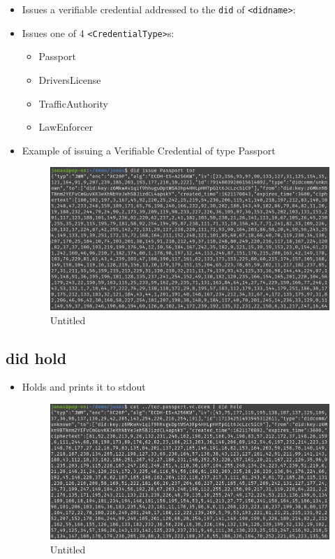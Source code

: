 \begin{itemize}
\item
  Issues a verifiable credential addressed to the
  \lstinline!did! of \lstinline!<didname>!:
\item
  Issues one of 4 \lstinline!<CredentialType>!s:

  \begin{itemize}
  \tightlist
  \item
    Passport
  \item
    DriversLicense
  \item
    TrafficAuthority
  \item
    LawEnforcer
  \end{itemize}
\item
  Example of issuing a Verifiable Credential of type Passport

  \begin{figure}
  \centering
  \includegraphics{User Interface f8759a9462b24d5f95cf6123d68b89ea/Untitled 10.png}
  \caption{Untitled}
  \end{figure}
\end{itemize}

\hypertarget{did-hold}{%
\subsection{\texorpdfstring{did hold }{did hold }}\label{did-hold}}

\begin{itemize}
\item
  Holds and prints it to stdout

  \begin{figure}
  \centering
  \includegraphics{User Interface f8759a9462b24d5f95cf6123d68b89ea/Untitled 11.png}
  \caption{Untitled}
  \end{figure}
\end{itemize}

